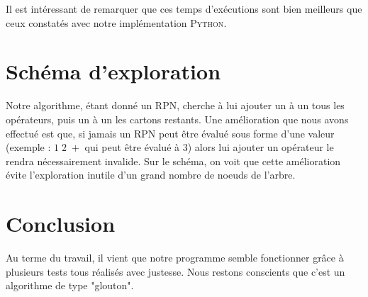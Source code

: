 \documentclass[11pt]{article}
\begin{document}
Il est intéressant de remarquer que ces temps d'exécutions sont bien meilleurs que ceux constatés avec notre implémentation \textsc{Python}.

\section{Schéma d'exploration}

Notre algorithme, étant donné un RPN, cherche à lui ajouter un à un tous les opérateurs, puis un à un les cartons restants.
Une amélioration que nous avons effectué est que, si jamais un RPN peut être évalué sous forme d'une valeur (exemple : $1 \; 2 \; +$ qui peut être évalué à $3$) alors lui ajouter un opérateur le rendra nécessairement invalide. Sur le schéma, on voit que cette amélioration évite l'exploration inutile d'un grand nombre de noeuds de l'arbre.


\section{Conclusion}

\quad \quad Au terme du travail, il vient que notre programme semble fonctionner grâce à plusieurs tests tous réalisés avec justesse. Nous restons conscients que c'est un algorithme de type "glouton".
\end{document}
